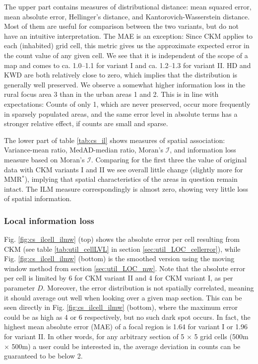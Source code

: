 The upper part contains measures of distributional distance: mean squared error, mean absolute error, Hellinger's distance, and Kantorovich-Wasserstein distance. Most of them are useful for comparison between the two variants, but do not have an intuitive interpretation. The MAE is an exception: Since CKM applies to each (inhabited) grid cell, this metric gives us the approximate expected error in the count value of any given cell. We see that it is independent of the scope of a map and comes to ca. 1.0--1.1 for variant I and ca. 1.2--1.3 for variant II. HD and KWD are both relatively close to zero, which implies that the distribution is generally well preserved. We observe a somewhat higher information loss in the rural focus area 3 than in the urban areas 1 and 2. This is in line with expectations: Counts of only 1, which are never preserved, occur more frequently in sparsely populated areas, and the same error level in absolute terms has a stronger relative effect, if counts are small and sparse.

The lower part of table \ref{tab:cs_il} shows measures of spatial association: Variance-mean ratio, MedAD-median ratio, Moran's $\mathcal{I}$, and information loss measure based on Moran's $\mathcal{I}$. Comparing for the first three the value of original data with CKM variants I and II we see overall little change (slightly more for MMR$^*$), implying that spatial characteristics of the areas in question remain intact. The ILM measure correspondingly is almost zero, showing very little loss of spatial information.

\subsubsection{Local information loss}

Fig. \ref{fig:cs_ilcell_ilmw} (top) shows the absolute error per cell resulting from CKM (see table \ref{tab:util_cellLVL} in section \ref{sec:util_LOC_cellerror}), while Fig. \ref{fig:cs_ilcell_ilmw} (bottom) is the smoothed version using the moving window method from section \ref{sec:util_LOC_mw}. Note that the absolute error per cell is limited by 6 for CKM variant II and 4 for CKM variant I, as per parameter $D$. Moreover, the error distribution is not spatially correlated, meaning it should average out well when looking over a given map section. This can be seen directly in Fig. \ref{fig:cs_ilcell_ilmw} (bottom), where the maximum error could be as high as 4 or 6 respectively, but no such dark spot occurs. In fact, the highest mean absolute error (MAE) of a focal region is 1.64 for variant I or 1.96 for variant II. In other words, for any arbitrary section of 5 $\times$ 5 grid cells (500m $\times$ 500m) a user could be interested in, the average deviation in counts can be guaranteed to be below 2.


